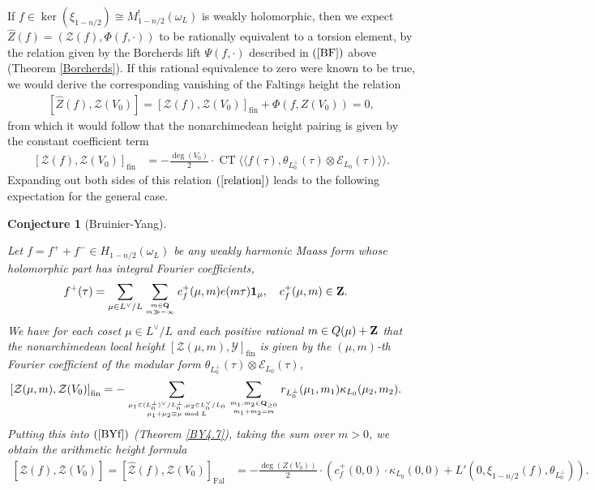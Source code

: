 \documentclass{amsart}
\newtheorem{conjecture}[theorem]{Conjecture}
\theoremstyle{definition}
\theoremstyle{definition}
\theoremstyle{definition}
\begin{document}
If $f \in \operatorname{ker}(\xi_{1-n/2}) \cong M_{1-n/2}^!(\omega_L)$ is weakly holomorphic, 
then we expect $\widehat{Z}(f) = (\mathcal{Z}(f), \Phi(f, \cdot))$ to be rationally equivalent to a torsion element, 
by the relation given by the Borcherds lift $\Psi(f, \cdot)$ described in $(\ref{BF})$ above (Theorem \ref{Borcherds}). 
If this rational equivalence to zero were known to be true, we would derive the 
corresponding vanishing of the Faltings height the relation 
\begin{align}\label{CV} \left[ \widehat{Z}(f), \mathcal{Z}(V_0) \right] 
= \left[ \mathcal{Z}(f), \mathcal{Z}(V_0) \right]_{\operatorname{fin}} + \Phi(f, Z(V_0)) = 0, \end{align}
from which it would follow that the nonarchimedean height pairing is given by the constant coefficient term 
\begin{align}\label{relation} \left[ \mathcal{Z}(f), \mathcal{Z}(V_0) \right]_{\operatorname{fin}}  &= - \frac{\deg(V_0)}{2} \cdot 
\operatorname{CT} \langle\langle f(\tau), \theta_{L_0^{\perp}}(\tau) \otimes \mathcal{E}_{L_0}(\tau) \rangle\rangle. \end{align}
Expanding out both sides of this relation $(\ref{relation})$ leads to the following expectation for the general case.

\begin{conjecture}[Bruinier-Yang]\label{BYC}

Let $f = f^+ + f^- \in H_{1-n/2}(\omega_L)$ be any weakly harmonic Maass form whose holomorphic part has integral Fourier coefficients,
\begin{align*} f^+(\tau) &= \sum\limits_{\mu \in L^{\vee}/L} 
\sum\limits_{m \in {\bf{Q}} \atop m \gg - \infty} c^+_f(\mu, m) e(m \tau) {\bf{1}}_{\mu}, \quad c^+_f(\mu, m) \in {\bf{Z}}.\end{align*}
We have for each coset $\mu \in L^{\vee}/L$ and each positive rational $m \in Q(\mu) + {\bf{Z}}$ that the nonarchimedean
local height $\left[ \mathcal{Z}(\mu, m), \mathcal{Y} \right]_{\operatorname{fin}}$ is given by the $(\mu, m)$-th Fourier coefficient
of the modular form $\theta_{L_0^{\perp}} (\tau) \otimes \mathcal{E}_{L_0}(\tau)$, 
\begin{align*} \left[ \mathcal{Z}(\mu, m), \mathcal{Z}(V_0) \right]_{\operatorname{fin}} &=  
- \sum\limits_{ \mu_1 \in (L_0^{\perp})^{\vee} / L_0^{\perp}, \mu_2 \in L_0^{\vee}/L_0 \atop \mu_1 + \mu_2 \equiv \mu \bmod L} 
\sum\limits_{m_1, m_2 \in {\bf{Q}}_{\geq 0} \atop m_1 + m_2 = m } r_{L_0^{\perp}}(\mu_1, m_1) \kappa_{L_0}(\mu_2, m_2). \end{align*}
Putting this into $(\ref{BYf})$ (Theorem \ref{BY4.7}), taking the sum over $m >0$, we obtain the arithmetic height formula 
\begin{align}\label{AHF} \left[ \widehat{\mathcal{Z}}(f), \mathcal{Z}(V_0)\right] = \left[ \widehat{\mathcal{Z}}(f), \mathcal{Z}(V_0)  \right]_{\operatorname{Fal}} 
&= - \frac{\deg(Z(V_0))}{2} \cdot \left( c_f^+(0, 0) \cdot \kappa_{L_0}(0,0) + L'(0, \xi_{1-n/2}(f), \theta_{L_0^{\perp}}) \right). \end{align} \end{conjecture}
\end{document}
